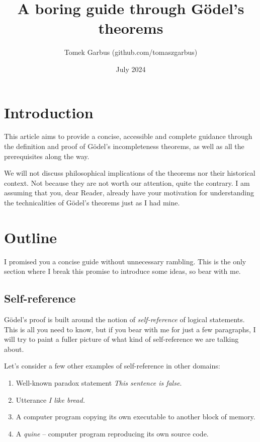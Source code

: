 \documentclass{article}
\title{A \textbf{boring} guide through Gödel's theorems}
\author{Tomek Garbus (github.com/tomaszgarbus)}
\date{July 2024}
\begin{document}
\maketitle

\section{Introduction}
This article aims to provide a concise, accessible and complete guidance
through the definition and proof of Gödel's incompleteness theorems, as well
as all the prerequisites along the way.

We will not discuss philosophical implications of the theorems nor their
historical context. Not because they are not worth our attention, quite the contrary.
I am assuming that you, dear Reader, already have your motivation for understanding the
technicalities of Gödel's theorems just as I had mine.

\section{Outline}

I promised you a concise guide without unnecessary rambling. This is the only section where
I break this promise to introduce some ideas, so bear with me.

\subsection{Self-reference}

Gödel's proof is built around the notion of \textit{self-reference} of logical statements.
This is all you need to know, but if you bear with me for just a few paragraphs, I will try
to paint a fuller picture of what kind of self-reference we are talking about.

Let's consider a few other examples of self-reference in other domains:

\begin{enumerate}
    \item Well-known paradox statement \textit{This sentence is false}.
    \item Utterance \textit{I like bread.}
    \item A computer program copying its own executable to another block of memory.
    \item A \textit{quine} -- computer program reproducing its own source code.
\end{enumerate}
\end{document}
